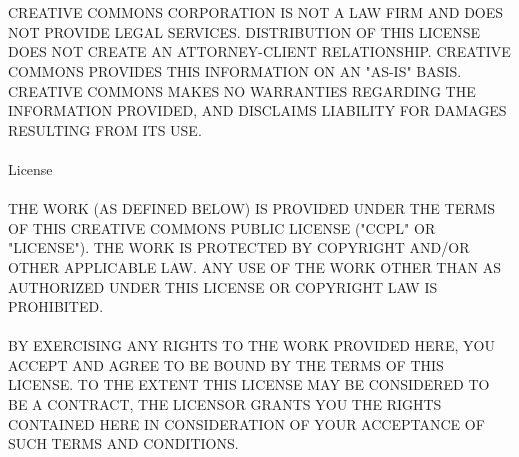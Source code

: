 \clearpage
\thispagestyle{empty}
\setcounter{secnumdepth}{0}
\label{sec:appendixL}
\\ \\
CREATIVE COMMONS CORPORATION IS NOT A LAW FIRM AND DOES NOT PROVIDE LEGAL
SERVICES. DISTRIBUTION OF THIS LICENSE DOES NOT CREATE AN ATTORNEY-CLIENT
RELATIONSHIP. CREATIVE COMMONS PROVIDES THIS INFORMATION ON AN "AS-IS" BASIS.
CREATIVE COMMONS MAKES NO WARRANTIES REGARDING THE INFORMATION PROVIDED, AND
DISCLAIMS LIABILITY FOR DAMAGES RESULTING FROM ITS USE.
\\ \\
License
\\ \\
THE WORK (AS DEFINED BELOW) IS PROVIDED UNDER THE TERMS OF THIS CREATIVE COMMONS
PUBLIC LICENSE ("CCPL" OR "LICENSE"). THE WORK IS PROTECTED BY COPYRIGHT AND/OR
OTHER APPLICABLE LAW. ANY USE OF THE WORK OTHER THAN AS AUTHORIZED UNDER THIS
LICENSE OR COPYRIGHT LAW IS PROHIBITED.
\\ \\
BY EXERCISING ANY RIGHTS TO THE WORK PROVIDED HERE, YOU ACCEPT AND AGREE TO BE
BOUND BY THE TERMS OF THIS LICENSE. TO THE EXTENT THIS LICENSE MAY BE CONSIDERED
TO BE A CONTRACT, THE LICENSOR GRANTS YOU THE RIGHTS CONTAINED HERE IN
CONSIDERATION OF YOUR ACCEPTANCE OF SUCH TERMS AND CONDITIONS.
\\
